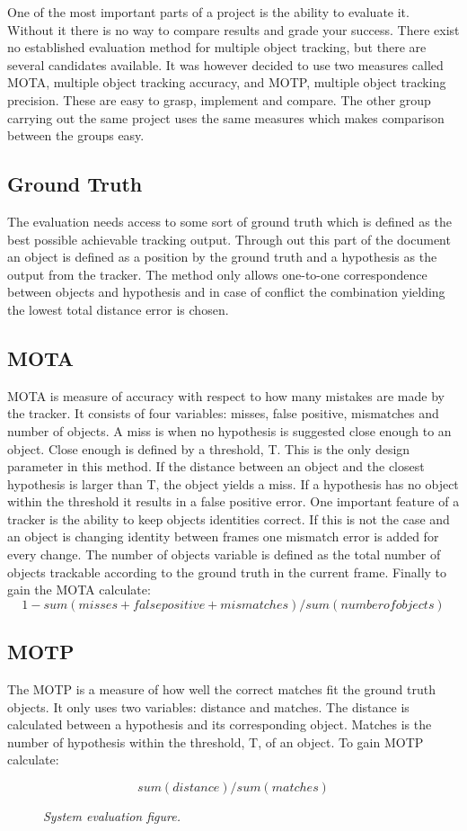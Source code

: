 One of the most important parts of a project is the ability to evaluate it. Without it there is no way to compare results and grade your success. There exist no established evaluation method for multiple object tracking, but there are several candidates available. It was however decided to use two measures called MOTA, multiple object tracking accuracy, and MOTP, multiple object tracking precision. These are easy to grasp, implement and compare. The other group carrying out the same project uses the same measures which makes comparison between the groups easy.

\subsection{Ground Truth}
The evaluation needs access to some sort of ground truth which is defined as the best possible achievable tracking output. Through out this part of the document an object is defined as a position by the ground truth and a hypothesis as the output from the tracker. The method only allows one-to-one correspondence between objects and hypothesis and in case of conflict the combination yielding the lowest total distance error is chosen.

\subsection{MOTA}
MOTA is measure of accuracy with respect to how many mistakes are made by the tracker. It consists of four variables: misses, false positive, mismatches and number of objects. A miss is when no hypothesis is suggested close enough to an object. Close enough is defined by a threshold, T. This is the only design parameter in this method. If the distance between an object and the closest hypothesis is larger than T, the object yields a miss. If a hypothesis has no object within the threshold it results in a false positive error. One important feature of a tracker is the ability to keep objects identities correct. If this is not the case and an object is changing identity between frames one mismatch error is added for every change. The number of objects variable is defined as the total number of objects trackable according to the ground truth in the current frame. Finally to gain the MOTA calculate:
$$
1 - sum(misses +false positive+mismatches)/sum(number of objects)
$$

\subsection{MOTP}
The MOTP is a measure of how well the correct matches fit the ground truth objects. It only uses two variables: distance and matches. The distance is calculated between a hypothesis and its corresponding object. Matches is the number of hypothesis within the 
threshold, T, of an object. To gain MOTP calculate:

$$
sum(distance)/sum(matches)
$$



\begin{figure}[htb]
	\centering
	\caption{\textit{System evaluation figure.}}
	\label{fig:system_evaluation_fig} %
\end{figure}



